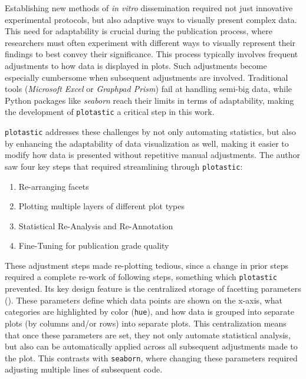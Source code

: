%
\label{sec:discussion_plotastic}%
Establishing new methods of \textit{in vitro} dissemination required not just
innovative experimental protocols, but also adaptive ways to visually present
complex data. This need for adaptability is crucial during the publication
process, where researchers must often experiment with different ways to visually
represent their findings to best convey their significance. This process
typically involves frequent adjustments to how data is displayed in plots. Such
adjustments become especially cumbersome when subsequent adjustments are
involved. Traditional tools (\textit{Microsoft Excel} or \textit{Graphpad
    Prism}) fail at handling semi-big data, while Python packages like
\textit{seaborn} reach their limits in terms of adaptability, making the
development of \texttt{plotastic} a critical step in this work.

\texttt{plotastic} addresses these challenges by not only automating statistics,
but also by enhancing the adaptability of data visualization as well, making it
easier to modify how data is presented without repetitive manual adjustments.
The author saw four key steps that required streamlining through \texttt{plotastic}:
\begin{enumerate}
    \item {Re-arranging facets}
    \item {Plotting multiple layers of different plot types}
    \item {Statistical Re-Analysis and Re-Annotation}
    \item {Fine-Tuning for publication grade quality}
\end{enumerate}

These adjustment steps made re-plotting tedious, since a change in prior steps
required a complete re-work of following steps, something which
\texttt{plotastic} prevented. Its key design feature is the centralized
storage of facetting parameters (\facetparams). These parameters define which
data points are shown on the x-axis, what categories are highlighted by color
(\texttt{hue}), and how data is grouped into separate plots (by columns and/or
rows) into separate plots. This centralization means that once these parameters
are set, they not only automate statistical analysis, but also can be
automatically applied across all subsequent adjustments made to the plot. This
contrasts with \texttt{seaborn}, where changing these parameters
required adjusting multiple lines of subsequent code.

